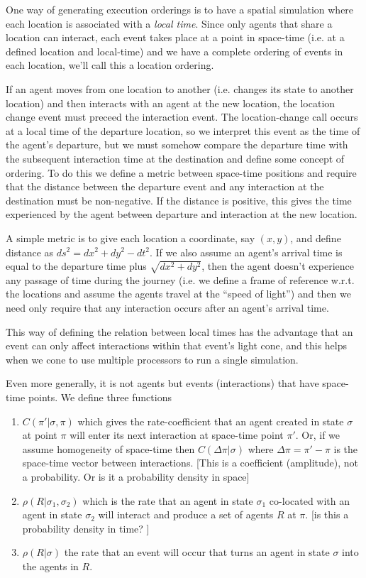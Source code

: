\documentclass[a4paper]{article}
\begin{document}
One way of generating execution orderings is to have a spatial simulation where each location is associated with a \textit{local time}. Since only agents that share a location can interact, each event takes place at a point in space-time (i.e. at a defined location and local-time) and we have a complete ordering of events in each location, we'll call this a location ordering.

If an agent moves from one location to another (i.e. changes its state to another location) and then interacts with an agent at the new location, the location change event must preceed the interaction event. The location-change call occurs at a local time of the departure location, so we interpret this event as the time of the agent's departure, but we must somehow compare the departure time with the subsequent interaction time at the destination and define some concept of ordering. To do this we define a metric between space-time positions and require that the distance between the departure event and any interaction at the destination must be non-negative. If the distance is positive, this gives the time experienced by the agent between departure and interaction at the new location.

A simple metric is to give each location a coordinate, say $(x,y)$, and define distance as $ds^2 = dx^2 + dy^2 - dt^2$. If we also assume an agent's arrival time is equal to the departure time plus $\sqrt{dx^2 + dy^2}$, then the agent doesn't experience any passage of time during the journey (i.e. we define a frame of reference w.r.t. the locations and assume the agents travel at the ``speed of light'') and then we need only require that any interaction occurs after an agent's arrival time.

This way of defining the relation between local times has the advantage that an event can only affect interactions within that event's light cone, and this helps when we cone to use multiple processors to run a single simulation.

Even more generally, it is not agents but events (interactions) that have space-time points. We define three functions
\begin{enumerate}
	\item $C(\pi' | \sigma, \pi)$ which gives the rate-coefficient that an agent created in state $\sigma$ at point $\pi$ will enter its next interaction at space-time point $\pi'$. Or, if we assume homogeneity of space-time then $C(\Delta\pi | \sigma)$ where $\Delta\pi = \pi' - \pi$ is the space-time vector between interactions. [This is a coefficient (amplitude), not a probability. Or is it a probability density in space]

	\item $\rho(R | \sigma_1, \sigma_2)$ which is the rate that an agent in state $\sigma_1$ co-located with an agent in state $\sigma_2$ will interact and produce a set of agents $R$ at $\pi$. [is this a probability density in time? ]
	
	\item $\rho(R | \sigma)$ the rate that an event will occur that turns an agent in state $\sigma$ into the agents in $R$.
\end{enumerate}	
\end{document}
